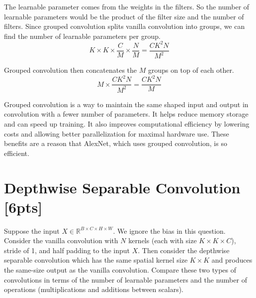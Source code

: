 \documentclass{article}
\begin{document}
{\color{blue}
The learnable parameter comes from the weights in the filters. So the number of learnable parameters would be the product of the filter size and the number of filters. Since grouped convolution splits vanilla convolution into groups, we can find the number of learnable parameters per group. 
\begin{equation}
    K \times K \times \frac{C}{M} \times \frac{N}{M}= \frac{CK^2N}{M^2} 
\end{equation}

Grouped convolution then concatenates the $M$ groups on top of each other.
\begin{equation}
    M \times \frac{CK^2N}{M^2}= \frac{CK^2N}{M}
\end{equation}

Grouped convolution is a way to maintain the same shaped input and output in convolution with a fewer number of parameters. It helps reduce memory storage and can speed up training. It also improves computational efficiency by lowering costs and allowing better parallelization for maximal hardware use. These benefits are a reason that AlexNet, which uses grouped convolution, is so efficient. 
}

\section{Depthwise Separable Convolution [6pts]}
\noindent
Suppose the input $X \in \mathbb{R}^{B \times C \times H \times W}$. We ignore the bias in this question. Consider the vanilla convolution with $N$ kernels (each with size $K \times K \times C$), stride of 1, and half padding to the input $X$. Then consider the depthwise separable convolution which has the same spatial kernel size $K \times K$ and produces the same-size output as the vanilla convolution. Compare these two types of convolutions in terms of the number of learnable parameters and the number of operations (multiplications and additions between scalars).\\
\end{document}
